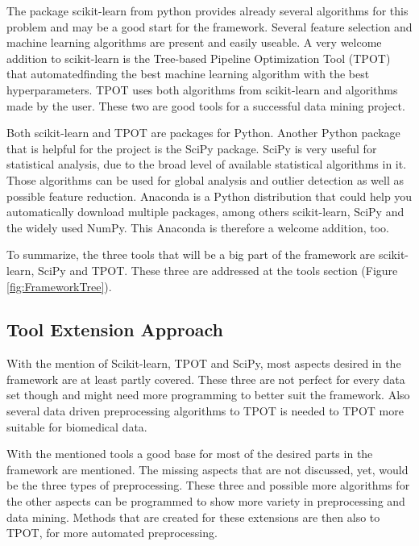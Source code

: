 \documentclass[10pt,a4paper]{article}
\begin{document}
	The package scikit-learn from python provides already several algorithms for this problem and may be a good start for the framework. Several feature selection and machine learning algorithms are present and easily useable. A very welcome addition to scikit-learn is the Tree-based Pipeline Optimization Tool (TPOT) that automatedfinding the best machine learning algorithm with the best hyperparameters. TPOT uses both algorithms from scikit-learn and algorithms made by the user. These two are good tools for a successful data mining project.
	
	Both scikit-learn and TPOT are packages for Python. Another Python package that is helpful for the project is the SciPy package. SciPy is very useful for statistical analysis, due to the broad level of available statistical algorithms in it. Those algorithms can be used for global analysis and outlier detection as well as possible feature reduction. Anaconda is a Python distribution that could help you automatically download multiple packages, among others scikit-learn, SciPy and the widely used NumPy. This Anaconda is therefore a welcome addition, too.
	
	To summarize, the three tools that will be a big part of the framework are scikit-learn, SciPy and TPOT. These three are addressed at the tools section (Figure \ref{fig:FrameworkTree}).
	
	\subsection{Tool Extension Approach}
	\label{subsec:ToolExtensionDrivenApproach}
	
	With the mention of Scikit-learn, TPOT and SciPy, most aspects desired in the framework are at least partly covered. These three are not perfect for every data set though and might need more programming to better suit the framework. Also several data driven preprocessing algorithms to TPOT is needed to TPOT more suitable for biomedical data. 
	
	With the mentioned tools a good base for most of the desired parts in the framework are mentioned. The missing aspects that are not discussed, yet, would be the three types of preprocessing. These three and possible more algorithms for the other aspects can be programmed to show more variety in preprocessing and data mining. Methods that are created for these extensions are then also to TPOT, for more automated preprocessing.
	
\end{document}
